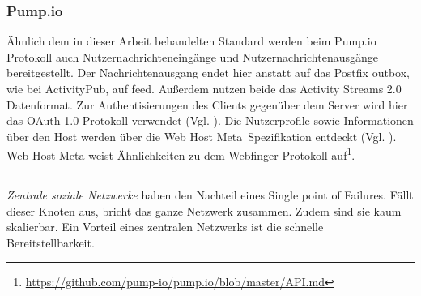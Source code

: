 	\subsubsection{Pump.io}
	\label{sub:pumpio}
	Ähnlich dem in dieser Arbeit behandelten Standard werden beim Pump.io Protokoll auch Nutzernachrichteneingänge und Nutzernachrichtenausgänge bereitgestellt. Der Nachrichtenausgang endet hier anstatt auf das Postfix \glqq outbox\grqq, wie bei ActivityPub, auf \glqq feed\grqq. Außerdem nutzen beide das Activity Streams 2.0 Datenformat. Zur Authentisierungen des Clients gegenüber dem Server wird hier das OAuth 1.0 Protokoll verwendet (Vgl. \cite{oauth-1.0-protocol}). Die Nutzerprofile sowie Informationen über den Host werden über die \glqq Web Host Meta\grqq~Spezifikation entdeckt (Vgl. \cite{web-host-meta}). Web Host Meta weist Ähnlichkeiten zu dem Webfinger Protokoll auf\footnote{\url{https://github.com/pump-io/pump.io/blob/master/API.md}}.
	
	\subsection{
		\label{sub:difference}
	}
	\textit{Zentrale soziale Netzwerke} haben den Nachteil eines \glqq Single point of Failures\grqq. Fällt dieser Knoten aus, bricht das ganze Netzwerk zusammen. Zudem sind sie kaum skalierbar. Ein Vorteil eines zentralen Netzwerks ist die schnelle Bereitstellbarkeit.\\
	

